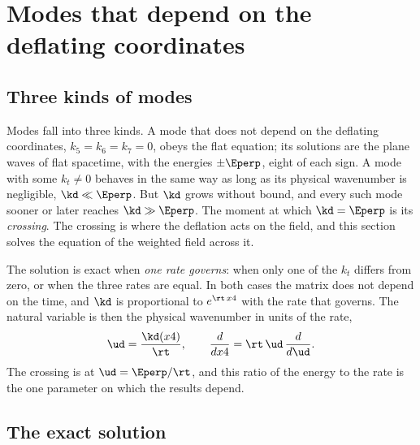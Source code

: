 \section{Modes that depend on the deflating coordinates}
\label{sec:modes}

\subsection{Three kinds of modes}

Modes fall into three kinds. A mode that does not depend on the deflating coordinates,
$k_5=k_6=k_7=0$, obeys the flat equation; its solutions are the plane waves of flat spacetime, with
the energies $\pm\Eperp$, eight of each sign. A mode with some $k_t\ne0$ behaves in the same way as
long as its physical wavenumber is negligible, $\kd\ll\Eperp$. But $\kd$ grows without bound, and
every such mode sooner or later reaches $\kd\gg\Eperp$. The moment at which $\kd=\Eperp$ is its
\emph{crossing}.  The crossing is where the deflation acts on the field, and
this section solves the equation of the weighted field across it.

The solution is exact when \emph{one rate governs}: when only one of the $k_t$ differs from zero, or
when the three rates are equal. In both cases the matrix  does not
depend on the time, and $\kd$ is proportional to $e^{\rt\,x4}$ with the rate that governs. The natural
variable is then the physical wavenumber in units of the rate,
\begin{equation}
\ud=\frac{\kd(x4)}{\rt},\qquad\frac{d}{dx4}=\rt\,\ud\,\frac{d}{d\ud}.
\label{eq:ud}
\end{equation}
The crossing is at $\ud=\Eperp/\rt$, and this ratio of the energy to the rate is the one parameter
on which the results depend.

\subsection{The exact solution}

